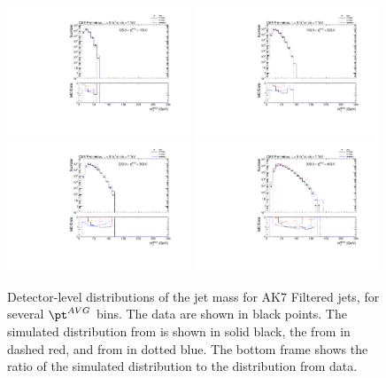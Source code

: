 \begin{figure}[htbp]
\centering
\includegraphics[width=0.49\textwidth]{figs/histAK7MjetVsPtAvg_rawDataMCComparisons_pt_2_Filtered}
\includegraphics[width=0.49\textwidth]{figs/histAK7MjetVsPtAvg_rawDataMCComparisons_pt_3_Filtered}
\includegraphics[width=0.49\textwidth]{figs/histAK7MjetVsPtAvg_rawDataMCComparisons_pt_4_Filtered}
\includegraphics[width=0.49\textwidth]{figs/histAK7MjetVsPtAvg_rawDataMCComparisons_pt_5_Filtered}
\caption{Detector-level distributions of the jet mass for AK7 Filtered jets,
for several $\pt^{AVG}$ bins. The data are shown in black points.
The simulated distribution from \PYTHIA is shown in solid black, 
the from \PYTHIAEIGHT in dashed red, and from \HERWIG in dotted blue. 
The bottom frame shows the ratio of the simulated distribution
to the distribution from data. 
\label{figs:histAK7MjetVsPtAvg_rawDataMCComparisons_pt_2_Filtered}}
\end{figure}


